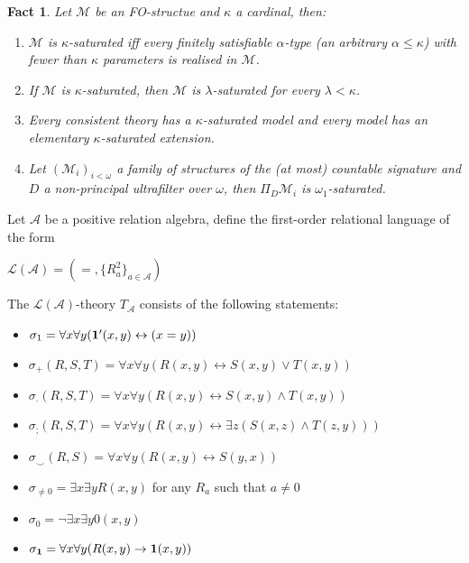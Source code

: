 \documentclass[a4paper]{article}
\theoremstyle{defin}
\theoremstyle{theorem}
\theoremstyle{claim}
\theoremstyle{prop}
\theoremstyle{lemma}
\theoremstyle{fact}
\newtheorem{fact}{Fact}
\theoremstyle{ex}
\theoremstyle{col}
\begin{document}
\begin{fact} Let $\mathcal{M}$ be an FO-structue and $\kappa$ a cardinal, then:
\begin{enumerate}
\item $\mathcal{M}$ is $\kappa$-saturated iff every finitely satisfiable $\alpha$-type (an arbitrary $\alpha \leq \kappa$) with fewer than $\kappa$ parameters is realised in  $\mathcal{M}$.
\item If $\mathcal{M}$ is $\kappa$-saturated, then $\mathcal{M}$ is $\lambda$-saturated for every $\lambda < \kappa$.
\item \label{saturation} Every consistent theory has a $\kappa$-saturated model and every model has an elementary $\kappa$-saturated extension.
\item Let $(\mathcal{M}_i)_{i < \omega}$ a family of structures of the (at most) countable signature and $D$ a non-principal ultrafilter over $\omega$, then $\Pi_D \mathcal{M}_i$ is $\omega_1$-saturated.
\end{enumerate}
\end{fact}

Let $\mathcal{A}$ be a positive relation algebra, define the first-order relational language of the form
\begin{center}
$\mathcal{L}(\mathcal{A}) = (=, \{ R^2_a \}_{a \in \mathcal{A}})$
\end{center}

The $\mathcal{L}(\mathcal{A})$-theory ${T}_{\mathcal{A}}$ consists of the following statements:
\begin{itemize}
\item $\sigma_1 = \forall x \forall y ({\bf 1}'(x, y) \leftrightarrow (x = y))$
\item $\sigma_+(R, S, T) = \forall x \forall y (R(x, y) \leftrightarrow S(x, y) \lor T (x, y))$
\item $\sigma_{\cdot}(R, S, T) = \forall x \forall y (R(x, y) \leftrightarrow S(x, y) \land T (x, y))$
\item $\sigma_{;}(R, S, T) = \forall x \forall y (R(x, y) \leftrightarrow \exists z (S(x, z) \land T(z, y)))$
\item $\sigma_{\smile}(R, S) = \forall x \forall y (R(x, y) \leftrightarrow S(y, x))$
\item $\sigma_{\neq 0} = \exists x \exists y R(x, y)$ for any $R_a$ such that $a \neq 0$
\item $\sigma_{0} = \neg \exists x \exists y 0(x, y)$
\item $\sigma_{{\bf 1}} = \forall x \forall y (R(x, y) \rightarrow {\bf 1}(x, y))$
\end{itemize}
\end{document}
